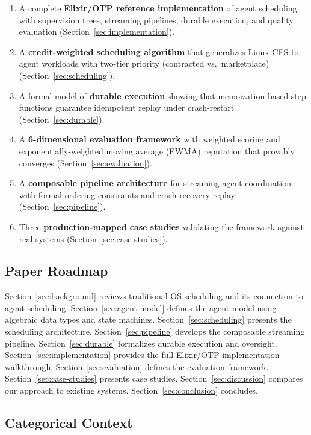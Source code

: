 \documentclass[12pt,a4paper]{article}
\theoremstyle{definition}
\theoremstyle{remark}
\begin{document}
\begin{enumerate}[leftmargin=2em]
  \item A complete \textbf{Elixir/OTP reference implementation} of agent scheduling with supervision trees, streaming pipelines, durable execution, and quality evaluation (Section~\ref{sec:implementation}).
  \item A \textbf{credit-weighted scheduling algorithm} that generalizes Linux CFS to agent workloads with two-tier priority (contracted vs.\ marketplace) (Section~\ref{sec:scheduling}).
  \item A formal model of \textbf{durable execution} showing that memoization-based step functions guarantee idempotent replay under crash-restart (Section~\ref{sec:durable}).
  \item A \textbf{6-dimensional evaluation framework} with weighted scoring and exponentially-weighted moving average (EWMA) reputation that provably converges (Section~\ref{sec:evaluation}).
  \item A \textbf{composable pipeline architecture} for streaming agent coordination with formal ordering constraints and crash-recovery replay (Section~\ref{sec:pipeline}).
  \item Three \textbf{production-mapped case studies} validating the framework against real systems (Section~\ref{sec:case-studies}).
\end{enumerate}

\subsection{Paper Roadmap}

Section~\ref{sec:background} reviews traditional OS scheduling and its connection to agent scheduling. Section~\ref{sec:agent-model} defines the agent model using algebraic data types and state machines. Section~\ref{sec:scheduling} presents the scheduling architecture. Section~\ref{sec:pipeline} develops the composable streaming pipeline. Section~\ref{sec:durable} formalizes durable execution and oversight. Section~\ref{sec:implementation} provides the full Elixir/OTP implementation walkthrough. Section~\ref{sec:evaluation} defines the evaluation framework. Section~\ref{sec:case-studies} presents case studies. Section~\ref{sec:discussion} compares our approach to existing systems. Section~\ref{sec:conclusion} concludes.

\subsection{Categorical Context}
\end{document}
